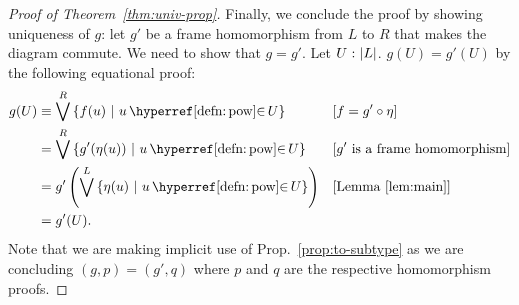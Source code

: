 \begin{proof}[Proof of Theorem~\ref{thm:univ-prop}]
  Finally, we conclude the proof by showing uniqueness of $g$: let $g'$ be a frame
  homomorphism from $L$ to $R$ that makes the diagram commute. We need to show that
  $g = g'$. Let $U\hspace{0.1mm}:\hspace{0.1mm}\left| L \right|$. $g(U) = g'(U)$ by the following equational proof:
  \begin{align*}
    g(U) &\equiv \bigvee^R \setof{ f(u) ~|~ u \mempownm U }
            &&\text{[$f = g' \circ \eta$]} \\
         &= \bigvee^R \setof{ g'(\eta(u)) ~|~ u \mempownm U }
            &&\text{[$g'$ is a frame homomorphism]} \\
         &= g'\left( \bigvee^L \setof{ \eta(u) ~|~ u \mempownm U } \right)
            &&\text{[Lemma~\ref{lem:main}]} \\
         &= g'(U).
  \end{align*}
  Note that we are making implicit use of Prop.~\ref{prop:to-subtype} as we are concluding
  $(g, p) = (g' , q)$ where $p$ and $q$ are the respective homomorphism proofs.
\end{proof}
